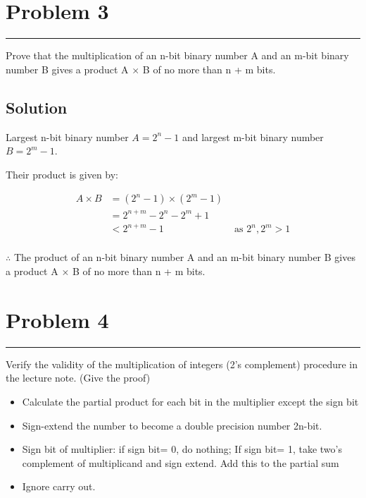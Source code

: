 \documentclass{article}
\begin{document}
\section*{Problem 3}
\hrule
\vspace{0.5cm}

Prove that the multiplication of an n-bit binary number A and an m-bit binary number B gives a product A $\times$ B of no more than n + m bits.

\subsection*{Solution}

Largest n-bit binary number $A=2^{n}-1$ and largest m-bit binary number $B=2^m-1$.

Their product is given by:

\[\begin{aligned}
        A \times B & = (2^n-1) \times (2^m-1)                             \\
                   & = 2^{n+m} - 2^n - 2^m + 1                            \\
                   & < 2^{n+m} -1              & \text{ as } 2^n, 2^m > 1 \\
    \end{aligned}\]

$\therefore$ The product of an n-bit binary number A and an m-bit binary number B gives a product A $\times$ B of no more than n + m bits.

\section*{Problem 4}
\hrule
\vspace{0.5cm}

Verify the validity of the multiplication of integers (2’s complement) procedure in the lecture note. (Give the proof)
\begin{itemize}
    \item Calculate the partial product for each bit in the multiplier except the sign bit
    \item Sign-extend the number to become a double precision number 2n-bit.
    \item Sign bit of multiplier: if sign bit= 0, do nothing; If sign bit= 1, take two’s complement of multiplicand and sign extend. Add this to the partial sum
    \item Ignore carry out.
\end{itemize}
\end{document}
